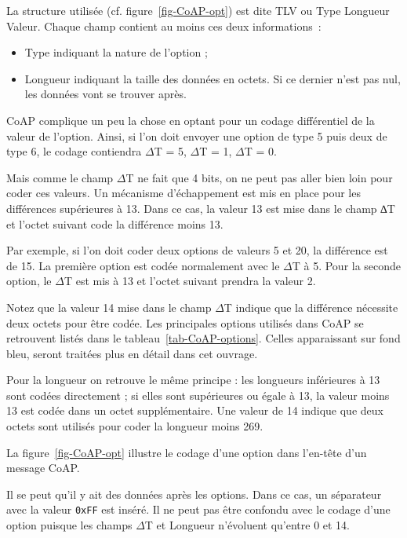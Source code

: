 La structure utilisée (cf. figure~\vref{fig-CoAP-opt}) est dite \ac{TLV} ou Type Longueur Valeur. Chaque champ contient au moins ces deux informations~:
\begin{itemize}
    \item Type indiquant la nature de l’option ;
    \item Longueur indiquant la taille des données en octets. Si ce dernier n’est pas nul, les données vont se trouver après. 
\end{itemize}

CoAP complique un peu la chose en optant pour un codage différentiel de la valeur de l’option. Ainsi, si l’on doit envoyer une option de type 5 puis deux de type 6, le codage contiendra $\Delta$T = 5, $\Delta$T = 1, $\Delta$T = 0.

         \vspace{1em}

Mais comme le champ $\Delta$T ne fait que 4 bits, on ne peut pas aller bien loin pour coder ces valeurs. Un mécanisme d'échappement est mis en place pour les différences supérieures à 13. Dans ce cas, la valeur 13 est mise dans le champ ∆T et l'octet suivant code la différence moins 13.

Par exemple, si l'on doit coder deux options de valeurs 5 et 20, la différence est de 15. La première option est codée normalement avec le $\Delta$T à 5. Pour la seconde option, le $\Delta$T est mis à 13 et l'octet suivant prendra la valeur 2.

Notez que la valeur 14 mise dans le champ $\Delta$T indique que la différence nécessite deux octets pour être codée. Les principales options utilisés dans CoAP se retrouvent listés dans le tableau~\vref{tab-CoAP-options}. Celles apparaissant sur fond bleu, seront traitées plus en détail dans cet ouvrage.

         \vspace{1em}

Pour la longueur on retrouve le même principe : les longueurs inférieures à 13 sont codées directement ; si elles sont supérieures ou égale à 13, la valeur moins 13 est codée dans un octet supplémentaire. Une valeur de 14 indique que deux octets sont utilisés pour coder la longueur moins 269.

La figure~\vref{fig-CoAP-opt} illustre le codage d’une option dans l’en-tête d’un message CoAP.

         \vspace{1em}

Il se peut qu’il y ait des données après les options. Dans ce cas, un séparateur avec la valeur \texttt{0xFF} est inséré. Il ne peut pas être confondu avec le codage d’une option puisque les champs $\Delta$T et Longueur n'évoluent qu'entre 0 et 14.

